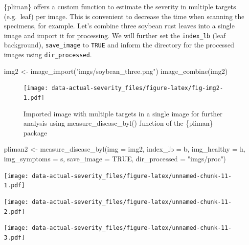 \documentclass[
  letterpaper,
]{book}
\newenvironment{Shaded}{\begin{snugshade}}{\end{snugshade}}
\newcommand{\AttributeTok}[1]{\textcolor[rgb]{0.40,0.45,0.13}{#1}}
\newcommand{\ConstantTok}[1]{\textcolor[rgb]{0.56,0.35,0.01}{#1}}
\newcommand{\FunctionTok}[1]{\textcolor[rgb]{0.28,0.35,0.67}{#1}}
\newcommand{\NormalTok}[1]{\textcolor[rgb]{0.00,0.23,0.31}{#1}}
\newcommand{\OtherTok}[1]{\textcolor[rgb]{0.00,0.23,0.31}{#1}}
\newcommand{\StringTok}[1]{\textcolor[rgb]{0.13,0.47,0.30}{#1}}
\begin{document}
\{pliman\} offers a custom function to estimate the severity in multiple
targets (e.g.~leaf) per image. This is convenient to decrease the time
when scanning the specimens, for example. Let's combine three soybean
rust leaves into a single image and import it for processing. We will
further set the \texttt{index\_lb} (leaf background),
\texttt{save\_image} to \texttt{TRUE} and inform the directory for the
processed images using \texttt{dir\_processed}.

\begin{Shaded}
\begin{Highlighting}[]
\NormalTok{img2 }\OtherTok{\textless{}{-}} \FunctionTok{image\_import}\NormalTok{(}\StringTok{"imgs/soybean\_three.png"}\NormalTok{)}
\FunctionTok{image\_combine}\NormalTok{(img2)}
\end{Highlighting}
\end{Shaded}

\begin{figure}

{\centering \texttt{[image: data-actual-severity\_files/figure-latex/fig-img2-1.pdf]}

}

\caption{\label{fig-img2}Imported image with multiple targets in a
single image for further analysis using measure\_disease\_byl() function
of the \{pliman\} package}

\end{figure}

\begin{Shaded}
\begin{Highlighting}[]
\NormalTok{ pliman2 }\OtherTok{\textless{}{-}} \FunctionTok{measure\_disease\_byl}\NormalTok{(}\AttributeTok{img =}\NormalTok{ img2,}
                        \AttributeTok{index\_lb =}\NormalTok{ b,}
                        \AttributeTok{img\_healthy =}\NormalTok{ h,}
                        \AttributeTok{img\_symptoms =}\NormalTok{ s, }
                        \AttributeTok{save\_image =} \ConstantTok{TRUE}\NormalTok{,}
                        \AttributeTok{dir\_processed =} \StringTok{"imgs/proc"}\NormalTok{)}
\end{Highlighting}
\end{Shaded}

\texttt{[image: data-actual-severity\_files/figure-latex/unnamed-chunk-11-1.pdf]}

\texttt{[image: data-actual-severity\_files/figure-latex/unnamed-chunk-11-2.pdf]}

\texttt{[image: data-actual-severity\_files/figure-latex/unnamed-chunk-11-3.pdf]}
\end{document}

